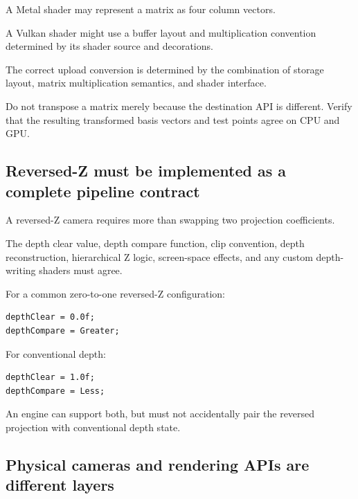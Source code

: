 A Metal shader may represent a matrix as four column vectors.

A Vulkan shader might use a buffer layout and multiplication convention determined by its shader source and decorations.

The correct upload conversion is determined by the combination of storage layout, matrix multiplication semantics, and shader interface.

Do not transpose a matrix merely because the destination API is different. Verify that the resulting transformed basis vectors and test points agree on CPU and GPU.

\subsection{Reversed-Z must be implemented as a complete pipeline contract}\label{02-foundations-ii-ch037-reversed-z-must-be-implemented-as-a-complete-pipeline-contract}

\hypertarget{02-foundations-ii-ch037-reversed-z-must-be-implemented-as-a-complete-pipeline-contract}{}

A reversed-Z camera requires more than swapping two projection coefficients.

The depth clear value, depth compare function, clip convention, depth reconstruction, hierarchical Z logic, screen-space effects, and any custom depth-writing shaders must agree.

For a common zero-to-one reversed-Z configuration:

\begin{verbatim}
depthClear = 0.0f;
depthCompare = Greater;
\end{verbatim}

For conventional depth:

\begin{verbatim}
depthClear = 1.0f;
depthCompare = Less;
\end{verbatim}

An engine can support both, but must not accidentally pair the reversed projection with conventional depth state.

\subsection{Physical cameras and rendering APIs are different layers}\label{02-foundations-ii-ch037-physical-cameras-and-rendering-apis-are-different-layers}

\hypertarget{02-foundations-ii-ch037-physical-cameras-and-rendering-apis-are-different-layers}{}

